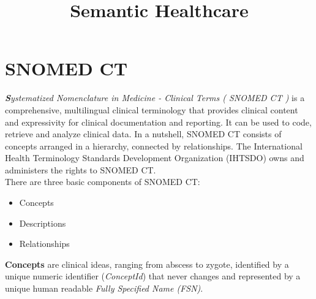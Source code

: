 \documentclass[DIV=calc, paper=a4, fontsize=12pt, onecolumn]{scrartcl}	 %
\title{Semantic Healthcare} %
\author{\authoring} %
\date{} %
\newcommand{\initial}[1]{ %
\lettrine[lines=3,lhang=0.3,nindent=0em,slope=0em]{
\color{DarkBlue}
{\textbf{\textit{#1}}}}{}}
\begin{document}
\maketitle

\begin{minipage}[t]{\textwidth}
\center{\bfseries\contentsname}
\begin{center}
\makeatletter
{}
\makeatother
\end{center}
\end{minipage}

\thispagestyle{fancy} %
\section[Systematized Nomenclature in Medicine - Clinical Terms ( SNOMED CT )]{SNOMED CT}

\initial{S}\textit{ystematized Nomenclature in Medicine - Clinical Terms ( SNOMED CT )} is a comprehensive, multilingual clinical terminology that provides clinical content and expressivity for clinical documentation and reporting. It can be used to code, retrieve and analyze clinical data. In a nutshell, SNOMED CT consists of concepts arranged in a hierarchy, connected by relationships. The International Health Terminology Standards Development Organization (IHTSDO) owns and administers the rights to SNOMED CT.\\

There are three basic components of SNOMED CT:
\begin{itemize}
	\item{Concepts}
	\item{Descriptions}
	\item{Relationships}
\end{itemize}

\textbf{Concepts} are clinical ideas, ranging from abscess to zygote, identified by a unique numeric identifier (\textit{ConceptId}) that never changes and represented by a unique human readable \textit{Fully Specified Name (FSN)}\cite{snomed_-_user_guide_snomed_2011,snomed_implementation_guide_snomed_2011}.




{}

\end{document}
